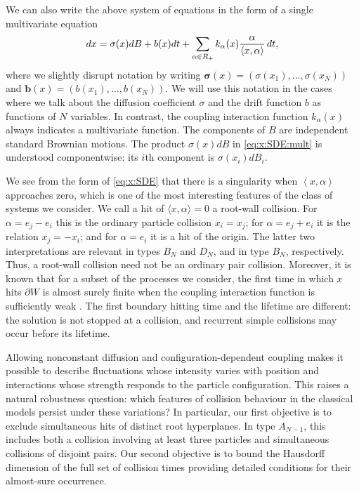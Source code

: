 \documentclass{article}
\numberwithin{equation}{section}
\newcommand{\C}{W}
\newcommand{\Cb}{\partial \C}
\newcommand{\xa}{\left<x,\alpha\right>}
\newcommand{\SaR}{\sum_{\alpha\in R_+}}
\theoremstyle{plain}
\begin{document}
We can also write the above system of equations in the form of a single multivariate equation
\begin{equation}
	\label{eq:x:SDE:mult}
	dx = \sigma(x)dB+b(x)dt+\SaR k_{\alpha}(x)\dfrac{\alpha}{\xa} \,dt\/,
\end{equation}
where we slightly disrupt notation by writing $\mathbf \sigma(x)=(\sigma(x_1),\ldots,\sigma(x_N))$ and $\mathbf b(x) = (b(x_1),\ldots,b(x_N))$. We will use this notation in the cases where we talk about the diffusion coefficient $\sigma$ and the drift function $b$ as functions of $N$ variables.
In contrast, the coupling interaction function $k_\alpha(x)$ always indicates a multivariate function. The components of $B$ are independent standard Brownian motions. The product $\sigma(x)dB$ in \eqref{eq:x:SDE:mult} is understood componentwise: its $i$th component is $\sigma(x_i)dB_i$.



We see from the form of \eqref{eq:x:SDE} that there is a singularity when $\xa$ approaches zero, which is one of the most interesting features of the class of systems we consider. We call a hit of $\langle x,\alpha\rangle=0$ a root-wall collision. For $\alpha=e_j-e_i$ this is the ordinary particle collision $x_i=x_j$; for $\alpha=e_j+e_i$ it is the relation $x_j=-x_i$; and for $\alpha=e_i$ it is a hit of the origin. The latter two interpretations are relevant in types $B_N$ and $D_N$, and in type $B_N$, respectively. Thus, a root-wall collision need not be an ordinary pair collision.
Moreover, it is known that for a subset of the processes we consider, the first time in which $x$ hits $\Cb$ is almost surely finite when the coupling interaction function is sufficiently weak \cite{Demni09}.
The first boundary hitting time and the lifetime are different: the solution is not stopped at a collision, and recurrent simple collisions may occur before its lifetime.

Allowing nonconstant diffusion and configuration-dependent coupling makes it possible to describe fluctuations whose intensity varies with position and interactions whose strength responds to the particle configuration. This raises a natural robustness question: which features of collision behaviour in the classical models persist under these variations? In particular, our first objective is to exclude simultaneous hits of distinct root hyperplanes. In type $A_{N-1}$, this includes both a collision involving at least three particles and simultaneous collisions of disjoint pairs. Our second objective is to bound the Hausdorff dimension of the full set of collision times providing detailed conditions for their almost-sure occurrence.
\end{document}
